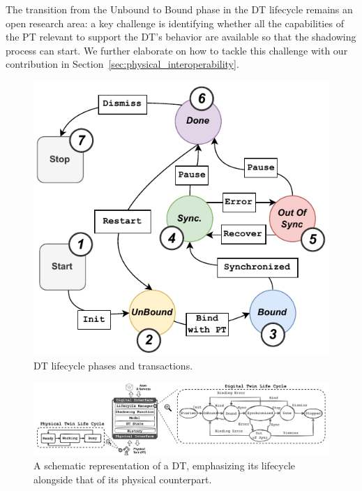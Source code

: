 The transition from the Unbound to Bound phase in the \ac{DT} lifecycle remains an open research area:
a key challenge is identifying whether all the capabilities of the \ac{PT} relevant to support the \ac{DT}'s behavior are available so that the shadowing process can start.
We further elaborate on how to tackle this challenge with our contribution in Section~\ref{sec:physical_interoperability}.

\begin{figure}[t]
    \setlength{\belowcaptionskip}{-13pt}
    \centering
    \includegraphics[width=0.8\linewidth]{figures/dt-interoperability/dt-lifecycle.pdf}
    \caption{\acl{DT} lifecycle phases and transactions.}
    \label{fig:lifecycle}
\end{figure}

\begin{figure}[t]
    \setlength{\belowcaptionskip}{-13pt}
    \centering
    \includegraphics[width=\textwidth]{figures/dt-lifecycle/dt_model_lifecycle_dt_pt.pdf}
    \caption{A schematic representation of a DT, emphasizing its lifecycle alongside that of its physical counterpart.}
    \label{fig:dt_model_pt_dt_lifecycles}
\end{figure}


